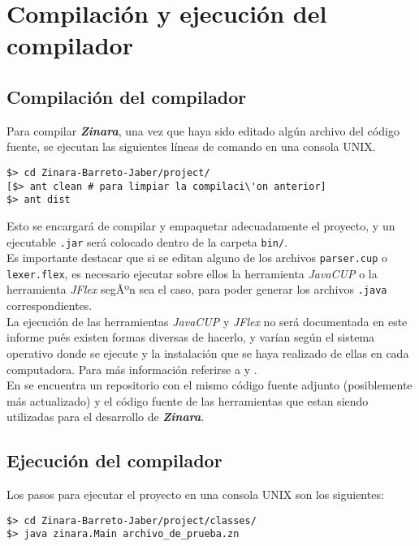 \documentclass[12pt, spanish]{report}
\begin{document}
\chapter{Compilaci\'on y ejecuci\'on del compilador}
\section{Compilaci\'on del compilador}
\label{sec:compilacion}
Para compilar \emph{\textbf{Zinara}}, una vez que haya sido editado
alg\'un archivo del c\'odigo fuente, se ejecutan las siguientes l\'ineas de
comando en una consola UNIX.

\begin{verbatim}
$> cd Zinara-Barreto-Jaber/project/
[$> ant clean # para limpiar la compilaci\'on anterior]
$> ant dist
\end{verbatim}

Esto se encargar\'a de compilar y empaquetar adecuadamente el proyecto,
y un ejecutable \texttt{.jar} ser\'a colocado dentro de la carpeta
\texttt{bin/}.\\

Es importante destacar que si se editan alguno de los archivos
\texttt{parser.cup} o \texttt{lexer.flex}, es necesario ejecutar sobre
ellos la herramienta \emph{JavaCUP} o la herramienta \emph{JFlex}
segÃºn sea el caso, para poder generar los archivos \texttt{.java}
correspondientes.\\

La ejecuci\'on de las herramientas \emph{JavaCUP} y \emph{JFlex} no ser\'a
documentada en este informe pu\'es existen formas diversas de hacerlo, y
var\'ian seg\'un el sistema operativo donde se ejecute y la instalaci\'on
que se haya realizado de ellas en cada computadora. Para m\'as
informaci\'on referirse a \cite{javacup} y \cite{jflex}.\\

En \cite{github} se encuentra un repositorio con el mismo c\'odigo
fuente adjunto (posiblemente m\'as actualizado) y el c\'odigo fuente de
las herramientas que estan siendo utilizadas para el desarrollo de
\emph{\textbf{Zinara}}.

\section{Ejecuci\'on del compilador}
\label{sec:zejecucion}
Los pasos para ejecutar el proyecto en una consola UNIX son los
siguientes:

\begin{verbatim}
$> cd Zinara-Barreto-Jaber/project/classes/
$> java zinara.Main archivo_de_prueba.zn
\end{verbatim}
\end{document}
